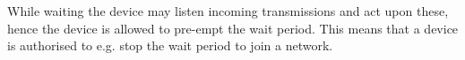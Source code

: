 While waiting the device may listen incoming transmissions and act upon these, hence the device is allowed to pre-empt the wait period.
This means that a device is authorised to e.g. stop the wait period to join a network. 






